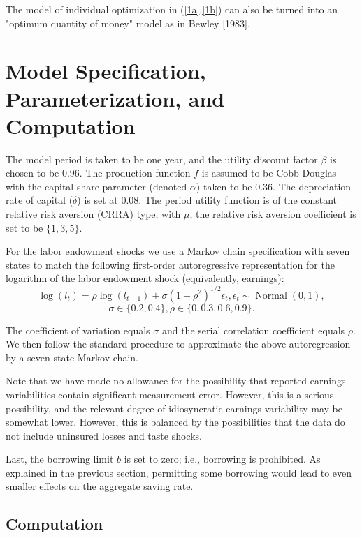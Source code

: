 \documentclass[12pt]{article}
\theoremstyle{definition}
\begin{document}
The model of individual optimization in (\ref{1a},\ref{1b}) can also be turned into an "optimum quantity of money" model as in Bewley [1983].

\section{Model Specification, Parameterization, and Computation}

The model period is taken to be one year, and the utility discount factor $\beta$ is chosen to be 0.96. The production function $f$ is assumed to be Cobb-Douglas with the capital share parameter (denoted $\alpha$) taken to be 0.36. The depreciation rate of capital ($\delta$) is set at 0.08. The period utility function is of the constant relative risk aversion (CRRA) type, with $\mu$, the relative risk aversion coefficient is set to be $\{1, 3, 5\}$.

For the labor endowment shocks we use a Markov chain specification with seven states to match the following first-order autoregressive representation for the logarithm of the labor endowment shock (equivalently, earnings):
\begin{equation}\label{9} \tag{9}
	\log \left(l_t\right)=\rho \log \left(l_{t-1}\right)+\sigma\left(1-\rho^2\right)^{1 / 2} \epsilon_t, \epsilon_t\sim\operatorname{Normal}(0,1),
\end{equation}
\begin{equation}\label{10} \tag{10}
	\sigma \in\{0.2,0.4\}, \rho \in\{0,0.3,0.6,0.9\}.
\end{equation}

The coefficient of variation equals $\sigma$ and the serial correlation coefficient equals $\rho$. We then follow the standard procedure to approximate the above autoregression by a seven-state Markov chain.

Note that we have made no allowance for the possibility that reported earnings variabilities contain significant measurement error. However, this is a serious possibility, and the relevant degree of idiosyncratic earnings variability may be somewhat lower. However, this is balanced by the possibilities that the data do not include uninsured losses and taste shocks.

Last, the borrowing limit $b$ is set to zero; i.e., borrowing is prohibited. As explained in the previous section, permitting some borrowing would lead to even smaller effects on the aggregate saving rate.

\subsection{Computation}
\end{document}
